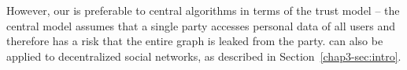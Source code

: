 However, our \AlgWSTriVR{} is preferable to central algorithms in terms of the trust model -- the central model assumes that a single party accesses personal data of all users and therefore has a risk that the entire graph is leaked from the party. 
\AlgWSTriVR{} can also be applied to decentralized social networks, as described in Section~\ref{chap3-sec:intro}. 




